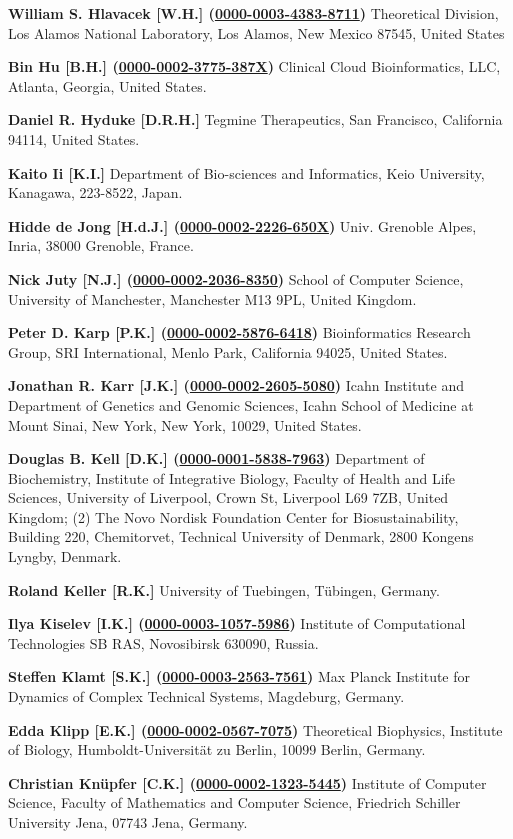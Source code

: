 \documentclass{sbml-paper}
\newcommand{\orcid}[1]{\href{https://orcid.org/#1}{#1}}
\begin{document}
\textbf{William S. Hlavacek [W.H.] (\orcid{0000-0003-4383-8711})} Theoretical Division, Los Alamos National Laboratory, Los Alamos, New Mexico 87545, United States

\textbf{Bin Hu [B.H.] (\orcid{0000-0002-3775-387X})} Clinical Cloud Bioinformatics, LLC, Atlanta, Georgia, United States.

\textbf{Daniel R. Hyduke [D.R.H.]} Tegmine Therapeutics, San Francisco, California 94114, United States.

\textbf{Kaito Ii [K.I.]} Department of Bio-sciences and Informatics, Keio University, Kanagawa, 223-8522, Japan.

\textbf{Hidde de Jong [H.d.J.] (\orcid{0000-0002-2226-650X})} Univ. Grenoble Alpes, Inria, 38000 Grenoble, France.

\textbf{Nick Juty [N.J.] (\orcid{0000-0002-2036-8350})} School of Computer Science, University of Manchester, Manchester M13 9PL, United Kingdom.

\textbf{Peter D. Karp [P.K.] (\orcid{0000-0002-5876-6418})} Bioinformatics Research Group, SRI International, Menlo Park, California 94025, United States.

\textbf{Jonathan R. Karr [J.K.] (\orcid{0000-0002-2605-5080})} Icahn Institute and Department of Genetics and Genomic Sciences, Icahn School of Medicine at Mount Sinai, New York, New York, 10029, United States.

\textbf{Douglas B. Kell [D.K.] (\orcid{0000-0001-5838-7963})} Department of Biochemistry, Institute of Integrative Biology, Faculty of Health and Life Sciences, University of Liverpool, Crown St, Liverpool L69 7ZB, United Kingdom; (2) The Novo Nordisk Foundation Center for Biosustainability, Building 220, Chemitorvet, Technical University of Denmark, 2800 Kongens Lyngby, Denmark.

\textbf{Roland Keller [R.K.]} University of Tuebingen, Tübingen, Germany.

\textbf{Ilya Kiselev [I.K.] (\orcid{0000-0003-1057-5986})} Institute of Computational Technologies SB RAS, Novosibirsk 630090, Russia.

\textbf{Steffen Klamt [S.K.] (\orcid{0000-0003-2563-7561})} Max Planck Institute for Dynamics of Complex Technical Systems, Magdeburg, Germany.

\textbf{Edda Klipp [E.K.] (\orcid{0000-0002-0567-7075})} Theoretical Biophysics, Institute of Biology, Humboldt-Universität zu Berlin, 10099 Berlin, Germany.

\textbf{Christian Knüpfer [C.K.] (\orcid{0000-0002-1323-5445})} Institute of Computer Science, Faculty of Mathematics and Computer Science, Friedrich Schiller University Jena, 07743 Jena, Germany.
\end{document}
